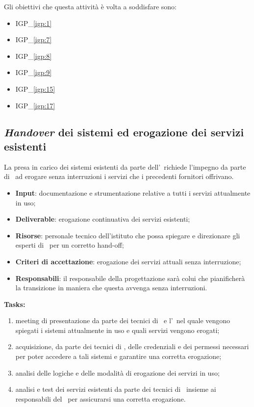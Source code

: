 		Gli obiettivi che questa attività è volta a soddisfare sono:
		\begin{itemize}[noitemsep]
			\renewcommand\labelitemi{--}
			\item {\color{pantone}IGP\_\ref{igp:1}}
			\item {\color{pantone}IGP\_\ref{igp:7}}
			\item {\color{pantone}IGP\_\ref{igp:8}}
			\item {\color{pantone}IGP\_\ref{igp:9}}
			\item {\color{pantone}IGP\_\ref{igp:15}}
			\item {\color{pantone}IGP\_\ref{igp:17}}
		\end{itemize}

	\subsection{\textit{Handover} dei sistemi ed erogazione dei servizi esistenti}
		
		La presa in carico dei sistemi esistenti da parte dell'\offerente~richiede l'impegno da parte di \azienda~ad erogare senza interruzioni i servizi che i precedenti fornitori offrivano.
		
		\begin{itemize}[noitemsep]
			\renewcommand\labelitemi{--}
			\item \textbf{Input}: documentazione e strumentazione relative a tutti i servizi attualmente in uso;
			\item \textbf{Deliverable}: erogazione continuativa dei servizi esistenti;
			\item \textbf{Risorse}: personale tecnico dell'istituto che possa spiegare e direzionare gli esperti di \azienda~per un corretto hand-off;
			\item \textbf{Criteri di accettazione}: erogazione dei servizi attuali senza interruzione;
			\item \textbf{Responsabili}: il responsabile della progettazione sarà colui che pianificherà la transizione in maniera che questa avvenga senza interruzioni.
		\end{itemize}
		
		\textbf{Tasks:}
		\begin{enumerate}[noitemsep]
			\item meeting di presentazione da parte dei tecnici di \azienda~e l'\istituto~nel quale vengono spiegati i sistemi attualmente in uso e quali servizi vengono erogati;
			\item acquisizione, da parte dei tecnici di \azienda, delle credenziali e dei permessi necessari per poter accedere a tali sistemi e garantire una corretta erogazione;
			\item analisi delle logiche e delle modalità di erogazione dei servizi in uso;
			\item analisi e test dei servizi esistenti da parte dei tecnici di \azienda~insieme ai responsabili del \proponente~per assicurarsi una corretta erogazione.
		\end{enumerate}
	
